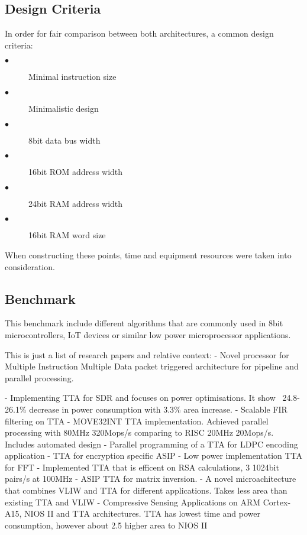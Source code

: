 \subsection{Design Criteria}
In order for fair comparison between both architectures, a common design criteria:
\begin{description}
	\item[$\bullet$] Minimal instruction size
	\item[$\bullet$] Minimalistic design
	\item[$\bullet$] 8bit data bus width
	\item[$\bullet$] 16bit ROM address width
	\item[$\bullet$] 24bit RAM address width
	\item[$\bullet$] 16bit RAM word size
\end{description}
When constructing these points, time and equipment resources were taken into consideration. 

\subsection{Benchmark}
This benchmark include different algorithms that are commonly used in 8bit microcontrollers, IoT devices or similar low power microprocessor applications.


\iffalse
This is just a list of research papers and relative context:
\autocite{5936440} - Novel processor for Multiple Instruction Multiple Data packet triggered architecture for pipeline and parallel processing.


\autocite{7363689} - Implementing TTA for SDR and focuses on power optimisations. It show ~24.8-26.1\% decrease in power consumption with 3.3\% area increase.
\autocite{1511285} - Scalable FIR filtering on TTA
\autocite{289981} - MOVE32INT TTA implementation. Achieved parallel processing with 80MHz 320Mops/s comparing to RISC 20MHz 20Mops/s. Includes automated design
\autocite{6855236} - Parallel programming of a TTA for LDPC encoding application
\autocite{922340} - TTA for encryption specific ASIP
\autocite{8682289} - Low power implementation TTA for FFT
\autocite{6128530} - Implemented TTA that is efficent on RSA calculations, 3 1024bit pairs/s at 100MHz
\autocite{1540373} - ASIP TTA for matrix inversion.
\autocite{6403142} - A novel microachitecture that combines VLIW and TTA for different applications. Takes less area than existing TTA and VLIW
\autocite{8573494} - Compressive Sensing Applications on ARM Cortex-A15, NIOS II and TTA architectures. TTA has lowest time and power consumption, however about 2.5 higher area to NIOS II

